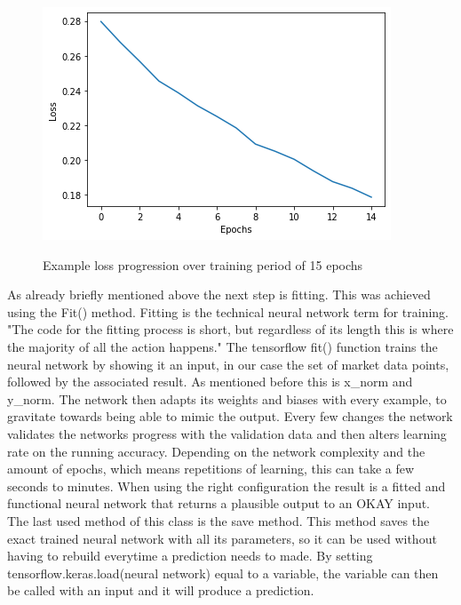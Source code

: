 \documentclass{article}
\begin{document}
\begin{figure}[!h]
    \centering
    \includegraphics[scale=0.6]{loss_im.png}
    \label{fig:loss}
    \caption{Example loss progression over training period of 15 epochs}
\end{figure}
\newline
As already briefly mentioned above the next step is fitting. This was achieved using the Fit() method. Fitting is the technical neural network  term for training. "The code for the fitting process is short, but regardless of its length this is where the majority of all the action happens." The tensorflow fit() function trains the neural network by showing it an input, in our case the set of market data points, followed by the associated result. As mentioned before this is x\_norm and y\_norm. The network then adapts its weights and biases with every example, to gravitate towards being able to mimic the output. Every few changes the network validates the networks progress with the validation data and then alters learning rate on the running accuracy. Depending on the network complexity and the amount of epochs, which means repetitions of learning, this can take a few seconds to minutes. When using the right configuration the result is a fitted and functional neural network that returns a plausible output to an OKAY input. The last used method of this class is the save method. This method saves the exact trained neural network with all its parameters, so it can be used without having to rebuild everytime a prediction needs to made. By setting tensorflow.keras.load(neural network) equal to a variable, the variable can then be called with an input and it will produce a prediction. 
\newline
\end{document}
